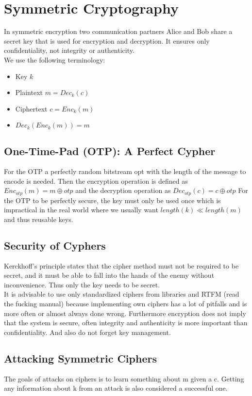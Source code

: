 
\section{Symmetric Cryptography}
In symmetric encryption two communication partners Alice and Bob share a secret key that is used for encryption and decryption.
It ensures only confidentiality, not integrity or authenticity.\\

We use the following terminology:
\begin{itemize}[noitemsep, topsep=0pt]
  \item Key $k$
  \item Plaintext $m = Dec_k(c)$
  \item Ciphertext $c = Enc_k(m)$
  \item $Dec_k(Enc_k(m)) = m$
\end{itemize}

\subsection{One-Time-Pad (OTP): A Perfect Cypher}
For the OTP a perfectly random bitstream opt with the length of the message to encode is needed.
Then the encryption operation is defined as $Enc_{otp}(m) = m \oplus otp$ and the decryption operation as $Dec_{otp}(c) = c \oplus otp$
For the OTP to be perfectly secure, the key must only be used once which is impractical in the real world where we usually want $length(k) \ll length(m)$ and thus reusable keys.

\subsection{Security of Cyphers}
Kerckhoff's principle states that the cipher method must not be required to be secret, and it must be able to fall into the hands of the enemy without inconvenience.
Thus only the key needs to be secret.\\
It is advisable to use only standardized ciphers from libraries and RTFM (read the fucking manual) because implementing own ciphers has a lot of pitfalls and is more often or almost always done wrong.
Furthermore encryption does not imply that the system is secure, often integrity and authenticity is more important than confidentiality.
And also do not forget key management.

\subsection{Attacking Symmetric Ciphers}
The goals of attacks on ciphers is to learn something about m given a c.
Getting any information about k from an attack is also considered a successful one.\\

